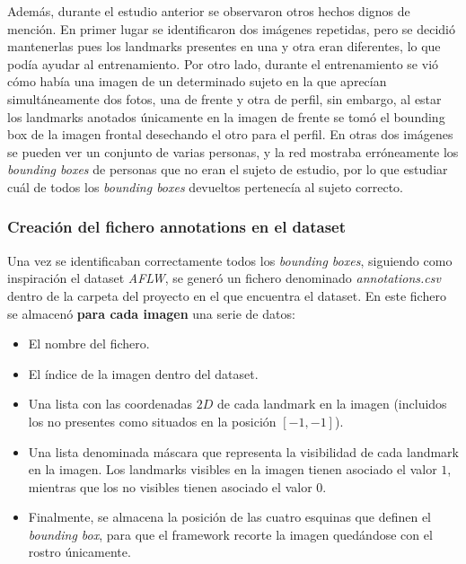             \noindent Además, durante el estudio anterior se observaron otros hechos dignos de mención. En primer lugar se identificaron dos imágenes repetidas, pero se decidió mantenerlas pues los landmarks presentes en una y otra eran diferentes, lo que podía ayudar al entrenamiento. Por otro lado, durante el entrenamiento se vió cómo había una imagen de un determinado sujeto en la que aprecían simultáneamente dos fotos, una  de frente y otra de perfil, sin embargo, al estar los landmarks anotados únicamente en la imagen de frente se tomó el bounding box de la imagen frontal desechando el otro para el perfil. En otras dos imágenes se pueden ver un conjunto de varias personas, y la red mostraba erróneamente los \textit{bounding boxes} de personas que no eran el sujeto de estudio, por lo que estudiar cuál de todos los \textit{bounding boxes} devueltos pertenecía al sujeto correcto.

        \subsubsection{Creación del fichero annotations en el dataset}

            \noindent Una vez se identificaban correctamente todos los \textit{bounding boxes}, siguiendo como inspiración el dataset \textit{AFLW}, se generó un fichero denominado \textit{annotations.csv} dentro de la carpeta del proyecto en el que encuentra el dataset. En este fichero se almacenó \textbf{para cada imagen} una serie de datos: 

            \begin{itemize}
                \item El nombre del fichero.
                \item El índice de la imagen dentro del dataset. 
                \item Una lista con las coordenadas $2D$ de cada landmark en la imagen (incluidos los no presentes como situados en la posición $[-1,-1]$). 
                \item Una lista denominada máscara que representa la visibilidad de cada landmark en la imagen. Los landmarks visibles en la imagen tienen asociado el valor $1$, mientras que los no visibles tienen asociado el valor $0$.
                \item Finalmente, se almacena la posición de las cuatro esquinas que definen el \textit{bounding box}, para que el framework recorte la imagen quedándose con el rostro únicamente. 
            \end{itemize}

